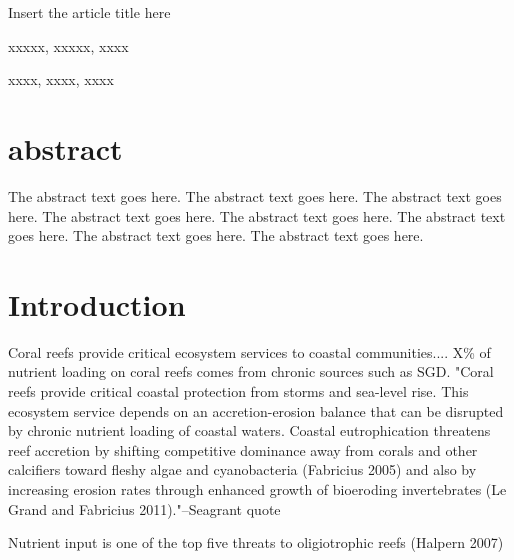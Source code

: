 \documentclass{article}%
\begin{document}
Insert the article title here




xxxxx, xxxxx, xxxx

xxxx, xxxx, xxxx


\linenumbers %
\section{abstract}
The abstract text goes here. The abstract text goes here. The abstract text goes here. The abstract text goes here.
The abstract text goes here. The abstract text goes here. The abstract text goes here. The abstract text goes here.




\section{Introduction  }

Coral reefs provide critical ecosystem services to coastal communities.... 
X\% of nutrient loading on coral reefs comes from chronic sources such as SGD.  
"Coral reefs provide critical coastal protection from storms and sea-level rise. This ecosystem service
depends on an accretion-erosion balance that can be disrupted by chronic nutrient loading of coastal waters.
Coastal eutrophication threatens reef accretion by shifting competitive dominance away from corals and other
calcifiers toward fleshy algae and cyanobacteria (Fabricius 2005) and also by increasing erosion rates through
enhanced growth of bioeroding invertebrates (Le Grand and Fabricius 2011)."--Seagrant quote

Nutrient input is one of the top five threats to oligiotrophic reefs (Halpern 2007)
\end{document}
